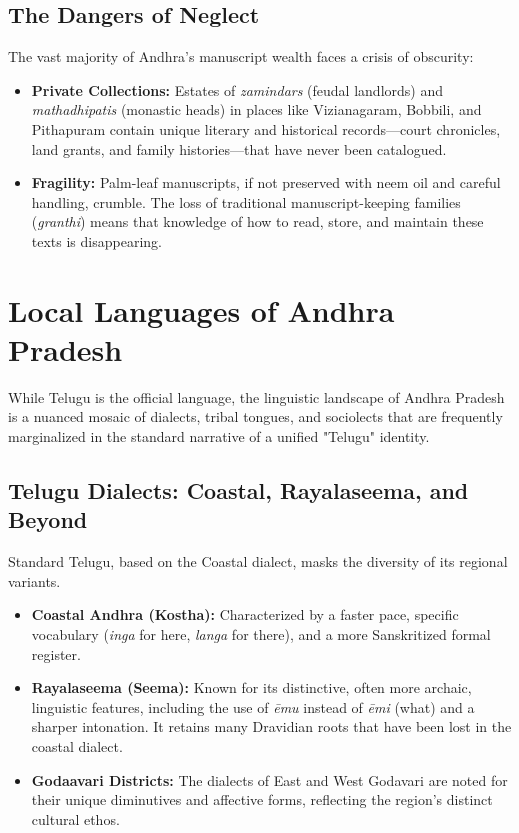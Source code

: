 \documentclass{article}
\begin{document}
\subsection{The Dangers of Neglect}
The vast majority of Andhra’s manuscript wealth faces a crisis of obscurity:
\begin{itemize}
    \item \textbf{Private Collections:} Estates of \textit{zamindars} (feudal landlords) and \textit{mathadhipatis} (monastic heads) in places like Vizianagaram, Bobbili, and Pithapuram contain unique literary and historical records—court chronicles, land grants, and family histories—that have never been catalogued.
    \item \textbf{Fragility:} Palm-leaf manuscripts, if not preserved with neem oil and careful handling, crumble. The loss of traditional manuscript-keeping families (\textit{granthi}) means that knowledge of how to read, store, and maintain these texts is disappearing.
\end{itemize}

\section{Local Languages of Andhra Pradesh}
While Telugu is the official language, the linguistic landscape of Andhra Pradesh is a nuanced mosaic of dialects, tribal tongues, and sociolects that are frequently marginalized in the standard narrative of a unified "Telugu" identity.

\subsection{Telugu Dialects: Coastal, Rayalaseema, and Beyond}
Standard Telugu, based on the Coastal dialect, masks the diversity of its regional variants.
\begin{itemize}
    \item \textbf{Coastal Andhra (Kostha):} Characterized by a faster pace, specific vocabulary (\textit{inga} for here, \textit{langa} for there), and a more Sanskritized formal register.
    \item \textbf{Rayalaseema (Seema):} Known for its distinctive, often more archaic, linguistic features, including the use of \textit{ēmu} instead of \textit{ēmi} (what) and a sharper intonation. It retains many Dravidian roots that have been lost in the coastal dialect.
    \item \textbf{Godaavari Districts:} The dialects of East and West Godavari are noted for their unique diminutives and affective forms, reflecting the region’s distinct cultural ethos.
\end{itemize}
\end{document}
